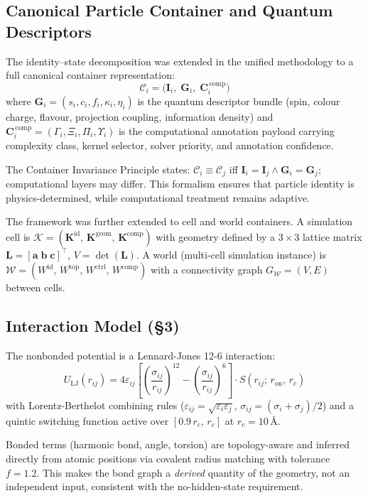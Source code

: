 \documentclass[11pt]{article}
\newcommand{\boldI}{\mathbf{I}}
\newcommand{\boldG}{\mathbf{G}}
\newcommand{\boldC}{\mathbf{C}}
\begin{document}
\subsection{Canonical Particle Container and Quantum Descriptors}

The identity--state decomposition was extended in the unified
methodology to a full canonical container representation:
\[
\mathcal{C}_i = \bigl(\boldI_i,\;\boldG_i,\;\boldC_i^{\,\mathrm{comp}}\bigr)
\]
where $\boldG_i = (s_i, c_i, f_i, \kappa_i, \eta_i)$ is the
quantum descriptor bundle (spin, colour charge, flavour,
projection coupling, information density) and
$\boldC_i^{\,\mathrm{comp}} = (\Gamma_i, \Xi_i, \Pi_i, \Upsilon_i)$
is the computational annotation payload carrying complexity class,
kernel selector, solver priority, and annotation confidence.

The Container Invariance Principle states:
$\mathcal{C}_i \equiv \mathcal{C}_j$ iff
$\boldI_i = \boldI_j \land \boldG_i = \boldG_j$;
computational layers may differ.
This formalism ensures that particle identity is
physics-determined, while computational treatment remains
adaptive.

The framework was further extended to cell and world
containers.  A simulation cell is
$\mathcal{K} = (\mathbf{K}^{\mathrm{id}},\,
\mathbf{K}^{\mathrm{geom}},\,\mathbf{K}^{\mathrm{comp}})$
with geometry defined by a $3 \times 3$ lattice matrix
$\mathbf{L} = [\mathbf{a}\;\mathbf{b}\;\mathbf{c}]^\top$,
$V = \det(\mathbf{L})$.
A world (multi-cell simulation instance) is
$\mathcal{W} = (W^{\mathrm{id}},\, W^{\mathrm{top}},\,
W^{\mathrm{ctrl}},\, W^{\mathrm{comp}})$
with a connectivity graph $G_{\mathcal{W}} = (V, E)$ between cells.

\subsection{Interaction Model (\S3)}

The nonbonded potential is a Lennard-Jones 12-6 interaction:
\[
U_{\mathrm{LJ}}(r_{ij}) = 4\varepsilon_{ij}
\left[\left(\frac{\sigma_{ij}}{r_{ij}}\right)^{12}
- \left(\frac{\sigma_{ij}}{r_{ij}}\right)^{6}\right]
\cdot S(r_{ij};\,r_{\mathrm{on}},\,r_c)
\]
with Lorentz-Berthelot combining rules
($\varepsilon_{ij} = \sqrt{\varepsilon_i\varepsilon_j}$,
$\sigma_{ij} = (\sigma_i + \sigma_j)/2$) and a quintic switching
function active over $[0.9\,r_c,\,r_c]$ at $r_c = 10$\,\AA.

Bonded terms (harmonic bond, angle, torsion) are topology-aware
and inferred directly from atomic positions via covalent radius
matching with tolerance $f = 1.2$.  This makes the bond graph a
\textit{derived} quantity of the geometry, not an independent
input, consistent with the no-hidden-state requirement.
\end{document}

